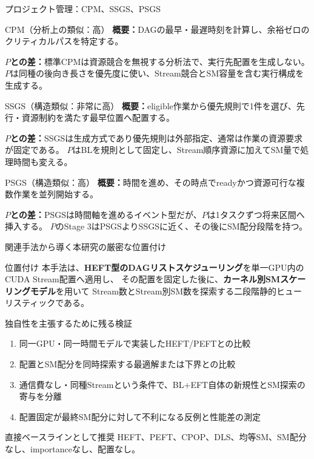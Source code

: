 \documentclass[aspectratio=169,10pt]{beamer}
\begin{document}
\begin{frame}{プロジェクト管理：CPM、SSGS、PSGS}
  \scriptsize
  \begin{block}{CPM（分析上の類似：高）}
    \textbf{概要：}DAGの最早・最遅時刻を計算し、余裕ゼロのクリティカルパスを特定する。\par
    \textbf{$P$との差：}標準CPMは資源競合を無視する分析法で、実行先配置を生成しない。
    $P$は同種の後向き長さを優先度に使い、Stream競合とSM容量を含む実行構成を生成する。
  \end{block}
  \begin{block}{SSGS（構造類似：非常に高）}
    \textbf{概要：}eligible作業から優先規則で1件を選び、先行・資源制約を満たす最早位置へ配置する。\par
    \textbf{$P$との差：}SSGSは生成方式であり優先規則は外部指定、通常は作業の資源要求が固定である。
    $P$はBLを規則として固定し、Stream順序資源に加えてSM量で処理時間も変える。
  \end{block}
  \begin{block}{PSGS（構造類似：高）}
    \textbf{概要：}時間を進め、その時点でreadyかつ資源可行な複数作業を並列開始する。\par
    \textbf{$P$との差：}PSGSは時間軸を進めるイベント型だが、$P$は1タスクずつ将来区間へ挿入する。
    $P$のStage 3はPSGSよりSSGSに近く、その後にSM配分段階を持つ。
  \end{block}
\end{frame}

\begin{frame}{関連手法から導く本研究の厳密な位置付け}
  \small
  \begin{block}{位置付け}
    本手法は、\textbf{HEFT型のDAGリストスケジューリング}を単一GPU内のCUDA Stream配置へ適用し、
    その配置を固定した後に、\textbf{カーネル別SMスケーリングモデル}を用いて
    Stream数とStream別SM数を探索する二段階静的ヒューリスティックである。
  \end{block}
  \begin{alertblock}{独自性を主張するために残る検証}
    \begin{enumerate}
      \item 同一GPU・同一時間モデルで実装したHEFT/PEFTとの比較
      \item 配置とSM配分を同時探索する最適解または下界との比較
      \item 通信費なし・同種Streamという条件で、BL+EFT自体の新規性とSM探索の寄与を分離
      \item 配置固定が最終SM配分に対して不利になる反例と性能差の測定
    \end{enumerate}
  \end{alertblock}
  \begin{exampleblock}{直接ベースラインとして推奨}
    HEFT、PEFT、CPOP、DLS、均等SM、SM配分なし、importanceなし、配置なし。
  \end{exampleblock}
\end{frame}
\end{document}

